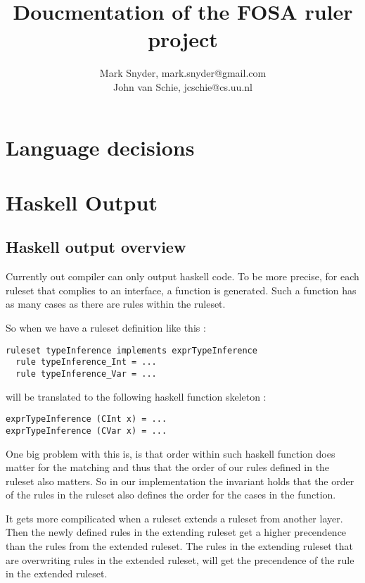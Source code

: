 \documentclass[10pt]{article}
\begin{document}
\title{Doucmentation of the FOSA ruler project}
\author{Mark Snyder, mark.snyder@gmail.com\\John van Schie, jcschie@cs.uu.nl}
\date{}
\maketitle

\section{Language decisions}

\section{Haskell Output}
\subsection{Haskell output overview}
Currently out compiler can only output haskell code. To be more precise, for each ruleset that complies to an interface, a function is generated. Such a function has as many cases as there are rules within the ruleset.

So when we have a ruleset definition like this :
\begin{verbatim}
ruleset typeInference implements exprTypeInference
  rule typeInference_Int = ...
  rule typeInference_Var = ...
\end{verbatim}
will be translated to the following haskell function skeleton :

\begin{verbatim}
exprTypeInference (CInt x) = ...
exprTypeInference (CVar x) = ...
\end{verbatim}

One big problem with this is, is that order within such haskell function does matter for the matching and thus that the order of our rules defined in the ruleset also matters. So in our implementation the invariant holds that the order of the rules in the ruleset also defines the order for the cases in the function.

It gets more compilicated when a ruleset extends a ruleset from another layer. Then the newly defined rules in the extending ruleset get a higher precendence than the rules from the extended ruleset. The rules in the extending ruleset that are overwriting rules in the extended ruleset, will get the precendence of the rule in the extended ruleset.
\end{document}
